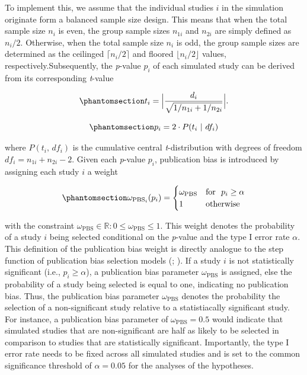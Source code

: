 \documentclass[
  12pt,
]{scrartcl}
\newcommand{\pbs}{\omega_{\text{PBS}}}
\begin{document}
To implement this, we assume that the individual studies \(i\) in the
simulation originate form a balanced sample size design. This means that
when the total sample size \(n_i\) is even, the group sample sizes
\(n_{1i}\) and \(n_{2i}\) are simply defined as \(n_i/2\). Otherwise,
when the total sample size \(n_i\) is odd, the group sample sizes are
determined as the ceilinged \(\lceil n_i/2 \rceil\) and floored
\(\lfloor n_i/2 \rfloor\) values, respectively.Subsequently, the
\emph{p}-value \(p_i\) of each simulated study can be derived from its
corresponding \emph{t}-value

\begin{equation}\phantomsection\label{eq-t-value}{
t_i=\Big\lvert \frac{d_i}{\sqrt{1/n_{1i} +1/n_{2i}}} \Big\rvert.
}\end{equation}

\begin{equation}\phantomsection\label{eq-p-value}{
p_i=2 \cdot P(t_i~|~df_i)
}\end{equation}

\noindent where \(P(t_i , \, df_i)\) is the cumulative central
\emph{t}-distribution with degrees of freedom \(df_i=n_{1i}+n_{2i}-2\).
Given each \emph{p}-value \(p_i\), publication bias is introduced by
assigning each study \(i\) a weight

\begin{equation}\phantomsection\label{eq-pbs}{
\omega_{\text{PBS}_i}(p_i)= \begin{cases}  
\pbs & \text{for}~~p_i \geq \alpha \\
1 & \text{otherwise}\end{cases}
}\end{equation}

with the constraint \(\pbs \in \mathbb{R} : 0 \leq \pbs \leq 1\). This
weight denotes the probability of a study \(i\) being selected
conditional on the \emph{p}-value and the type I error rate \(\alpha\).
This definition of the publication bias weight is directly analogue to
the step function of publication bias selection models
(;
). If
a study \(i\) is not statistically significant (i.e.,
\(p_i \geq \alpha\)), a publication bias parameter \(\pbs\) is assigned,
else the probability of a study being selected is equal to one,
indicating no publication bias. Thus, the publication bias parameter
\(\pbs\) denotes the probability the selection of a non-significant
study relative to a statistiacally significant study. For instance, a
publication bias parameter of \(\pbs=0.5\) would indicate that simulated
studies that are non-significant are half as likely to be selected in
comparison to studies that are statistically significant. Importantly,
the type I error rate needs to be fixed across all simulated studies and
is set to the common significance threshold of \(\alpha = 0.05\) for the
analyses of the hypotheses.
\end{document}
